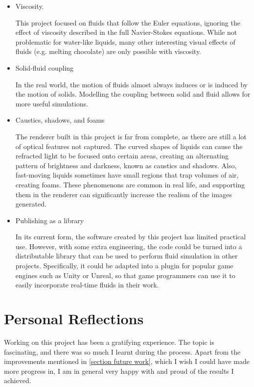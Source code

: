 \begin{itemize}
    \item Viscosity.
    
    This project focused on fluids that follow the Euler equations, ignoring the effect of viscosity described in the full Navier-Stokes equations. While not problematic for water-like liquids, many other interesting visual effects of fluids (e.g. melting chocolate) are only possible with viscosity. 
    

    \item Solid-fluid coupling
    
    In the real world, the motion of fluids almost always induces or is induced by the motion of solids. Modelling the coupling between solid and fluid allows for more useful simulations. 

    \item Caustics, shadows, and foams
    
    The renderer built in this project is far from complete, as there are still a lot of optical features not captured. The curved shapes of liquids can cause the refracted light to be focused onto certain areas, creating an alternating pattern of brightness and darkness, known as caustics and shadows. Also, fast-moving liquids sometimes have small regions that trap volumes of air, creating foams. These phenomenons are common in real life, and supporting them in the renderer can significantly increase the realism of the images generated.


    \item Publishing as a library
    
    In its current form, the software created by this project has limited practical use. However, with some extra engineering, the code could be turned into a distributable library that can be used to perform fluid simulation in other projects. Specifically, it could be adapted into a plugin for popular game engines such as Unity or Unreal, so that game programmers can use it to easily incorporate real-time fluids in their work. 
    
\end{itemize}

\section{Personal Reflections}
Working on this project has been a gratifying experience. The topic is fascinating, and there was so much I learnt during the process. Apart from the improvements mentioned in \ref{section future work}, which I wish I could have made more progress in, I am in general very happy with and proud of the results I achieved.

